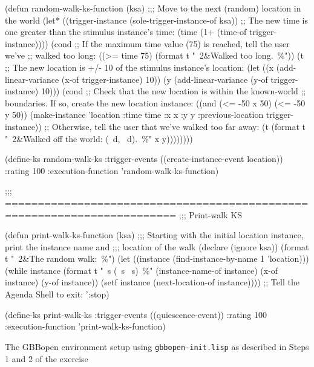 \documentclass[10pt,twoside,english,pdftex]{article}
\begin{document}
\begin{tightitemize}
\begin{example}
  (defun random-walk-ks-function (ksa)
    ;;; Move to the next (random) location in the world
    (let* ((trigger-instance (sole-trigger-instance-of ksa))
           ;; The new time is one greater than the stimulus instance's time:
           (time (1+ (time-of trigger-instance))))
      (cond
       ;; If the maximum time value (75) is reached, tell the user we've
       ;; walked too long:
       ((>= time 75) (format t "~2&Walked too long.~\%"))
       (t ;; The new location is +/- 10 of the stimulus instance's location:
        (let ((x (add-linear-variance (x-of trigger-instance) 10))
              (y (add-linear-variance (y-of trigger-instance) 10)))
          (cond
           ;; Check that the new location is within the known-world
           ;; boundaries.  If so, create the new location instance:
           ((and (<= -50 x 50) (<= -50 y 50))
            (make-instance 'location 
              :time time 
              :x x 
              :y y
              :previous-location trigger-instance))
           ;; Otherwise, tell the user that we've walked too far away:
           (t (format t "~2&Walked off the world: (~d, ~d).~\%" x y))))))))

  (define-ks random-walk-ks
      :trigger-events ((create-instance-event location))
      :rating 100
      :execution-function 'random-walk-ks-function)

  ;;; ========================================================================
  ;;;   Print-walk KS

  (defun print-walk-ks-function (ksa)
    ;;; Starting with the initial location instance, print the instance name and
    ;;; location of the walk
    (declare (ignore ksa))
    (format t "~2\&The random walk:~\%")
      (let ((instance (find-instance-by-name 1 'location)))
      (while instance
        (format t "~s (~s ~s)~\%"
                (instance-name-of instance)
                (x-of instance)
                (y-of instance))
        (setf instance (next-location-of instance))))
    ;; Tell the Agenda Shell to exit:
    ':stop)

  (define-ks print-walk-ks
    :trigger-events ((quiescence-event))
    :rating 100
    :execution-function 'print-walk-ks-function)
\end{example}

\item The GBBopen environment setup using \texttt{gbbopen-init.lisp}
  as described in Steps 1 and 2 of the  exercise
\end{tightitemize}
\end{document}
